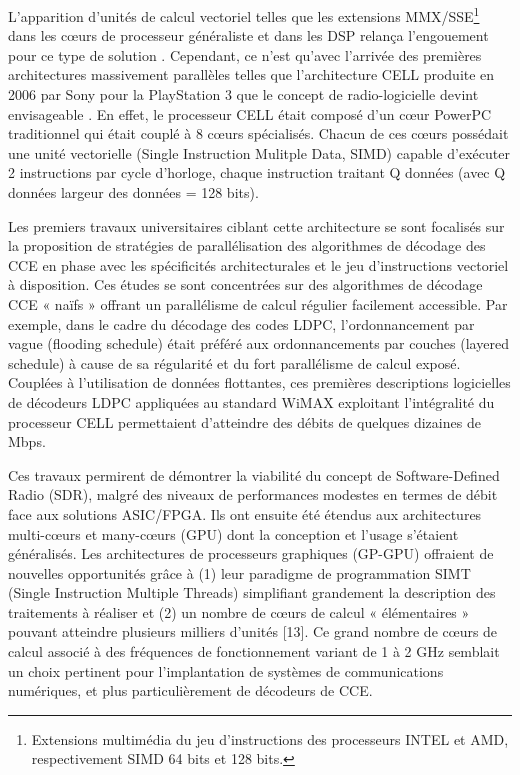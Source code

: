 \documentclass[../main.tex]{subfiles}
\begin{document}
L’apparition d’unités de calcul vectoriel telles que les extensions MMX/SSE\footnote{Extensions multimédia du jeu d’instructions des processeurs INTEL et AMD, respectivement SIMD 64 bits et 128 bits.} dans les cœurs de processeur généraliste et dans les DSP relança l’engouement pour ce type de solution \cite{turbo:mmx,viterbi:sse,viterbi:mmx}. Cependant, ce n’est qu’avec l'arrivée des premières architectures massivement parallèles telles que l'architecture CELL \cite{CELL} produite en 2006 par Sony pour la PlayStation 3 que le concept de radio-logicielle devint envisageable  \cite{CELL:LDPC1,CELL:LDPC2,CELL:TURBO}. En effet, le processeur CELL était composé d’un cœur PowerPC traditionnel qui était couplé à 8 cœurs spécialisés. Chacun de ces cœurs possédait une unité vectorielle (Single Instruction Mulitple Data, SIMD) capable d’exécuter 2 instructions par cycle d’horloge, chaque instruction traitant Q données (avec Q données \times  largeur des données = 128 bits).



Les premiers travaux universitaires ciblant cette architecture  \cite{CELL:LDPC1,CELL:LDPC2,CELL:TURBO} se sont focalisés sur la proposition de stratégies de parallélisation des algorithmes de décodage des CCE en phase avec les spécificités architecturales et le jeu d’instructions vectoriel à disposition. Ces études se sont concentrées sur des algorithmes de décodage CCE « naïfs » offrant un parallélisme de calcul régulier facilement accessible. Par exemple, dans le cadre du décodage des codes LDPC, l’ordonnancement par vague (flooding schedule) était préféré aux ordonnancements par couches (layered schedule) à cause de sa régularité et du fort parallélisme de calcul exposé. Couplées à l’utilisation de données flottantes, ces premières descriptions logicielles de décodeurs LDPC appliquées au standard WiMAX exploitant l’intégralité du processeur CELL permettaient d’atteindre des débits de quelques dizaines de Mbps. 



Ces travaux permirent de démontrer la viabilité du concept de Software-Defined Radio (SDR), malgré des niveaux de performances modestes en termes de débit face aux solutions ASIC/FPGA. Ils ont ensuite été étendus aux architectures multi-cœurs et many-cœurs (GPU) dont la conception et l’usage s'étaient généralisés. Les architectures de processeurs graphiques (GP-GPU) offraient de nouvelles opportunités grâce à (1) leur paradigme de programmation SIMT (Single Instruction Multiple Threads) simplifiant grandement la description des traitements à réaliser et (2) un nombre de cœurs de calcul « élémentaires » pouvant atteindre plusieurs milliers d’unités \cite{14}[13]. Ce grand nombre de cœurs de calcul associé à des fréquences de fonctionnement variant de 1 à 2 GHz semblait un choix pertinent pour l’implantation de systèmes de communications numériques, et plus particulièrement de décodeurs de CCE.
\end{document}
